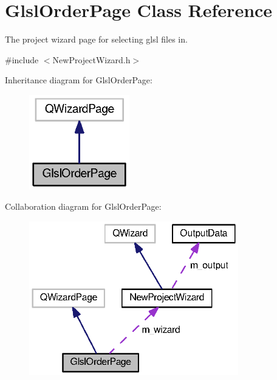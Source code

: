 \section{Glsl\-Order\-Page Class Reference}
\label{class_glsl_order_page}


The project wizard page for selecting glsl files in.  




{\ttfamily \#include $<$New\-Project\-Wizard.\-h$>$}



Inheritance diagram for Glsl\-Order\-Page\-:\nopagebreak
\begin{figure}[H]
\begin{center}
\leavevmode
\includegraphics[width=124pt]{class_glsl_order_page__inherit__graph}
\end{center}
\end{figure}


Collaboration diagram for Glsl\-Order\-Page\-:\nopagebreak
\begin{figure}[H]
\begin{center}
\leavevmode
\includegraphics[width=258pt]{class_glsl_order_page__coll__graph}
\end{center}
\end{figure}
